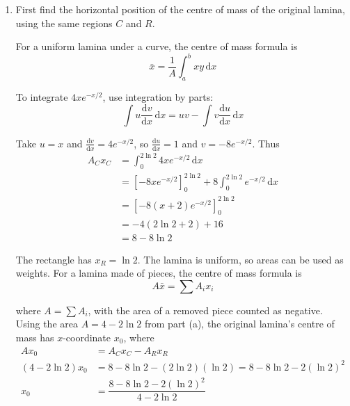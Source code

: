 \documentclass[leqno]{article}
\begin{document}
\begin{enumerate}[
  label=\textbf{\arabic*.},
  leftmargin=*,
  topsep=0pt,
  partopsep=0pt,
  parsep=0pt
]
\begin{djsSolution}
\begin{enumerate}[label=\textbf{(\alph*)}, start=1]
The rectangle has \(y_R=\frac12\). The lamina is uniform, so areas can be used as weights. For a lamina made of pieces, the centre of mass formula is
\[
A\bar{y}=\sum A_iy_i
\]

where \(A=\sum A_i\), with the area of a removed piece counted as negative. Hence
\begin{align*}
A\bar{y}&=A_Cy_C-A_Ry_R\\
(4-2\ln 2)\bar{y}&=4\left(\frac32\right)-(2\ln 2)\left(\frac12\right)
=6-\ln 2\\
\bar{y}&=\dfrac{6-\ln 2}{4-2\ln 2}
\end{align*}

\item First find the horizontal position of the centre of mass of the original lamina, using the same regions \(C\) and \(R\).

For a uniform lamina under a curve, the centre of mass formula is
\[
\bar{x}=\frac{1}{A}\int_a^b xy\,\mathrm{d}x
\]

To integrate \(4xe^{-x/2}\), use integration by parts:
\[
\int u\frac{\mathrm{d}v}{\mathrm{d}x}\,\mathrm{d}x=uv-\int v\frac{\mathrm{d}u}{\mathrm{d}x}\,\mathrm{d}x
\]

Take \(u=x\) and \(\frac{\mathrm{d}v}{\mathrm{d}x}=4e^{-x/2}\), so \(\frac{\mathrm{d}u}{\mathrm{d}x}=1\) and \(v=-8e^{-x/2}\). Thus
\begin{align*}
A_Cx_C&=\int_0^{2\ln 2}4xe^{-x/2}\,\mathrm{d}x\\
&=\left[-8xe^{-x/2}\right]_0^{2\ln 2}
+8\int_0^{2\ln 2}e^{-x/2}\,\mathrm{d}x\\
&=\left[-8(x+2)e^{-x/2}\right]_0^{2\ln 2}\\
&=-4(2\ln 2+2)+16\\
&=8-8\ln 2
\end{align*}

The rectangle has \(x_R=\ln 2\). The lamina is uniform, so areas can be used as weights. For a lamina made of pieces, the centre of mass formula is
\[
A\bar{x}=\sum A_ix_i
\]

where \(A=\sum A_i\), with the area of a removed piece counted as negative. Using the area \(A=4-2\ln 2\) from part (a), the original lamina's centre of mass has \(x\)-coordinate \(x_0\), where
\begin{align*}
Ax_0&=A_Cx_C-A_Rx_R\\
(4-2\ln 2)x_0&=8-8\ln 2-(2\ln 2)(\ln 2)
=8-8\ln 2-2(\ln 2)^2\\
x_0&=\dfrac{8-8\ln 2-2(\ln 2)^2}{4-2\ln 2}
\end{align*}


\end{enumerate}
\end{djsSolution}
\end{enumerate}
\end{document}
